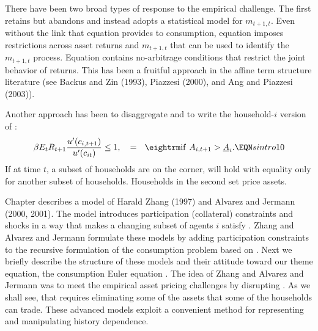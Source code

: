   There have been two broad types of response to the empirical challenge.
The first retains  but abandons  and instead
 adopts
a statistical  model for $m_{t+1,t}$. Even without the link that
equation  provides to consumption, equation
 imposes restrictions across  asset returns and
$m_{t+1,t}$ that can be used to identify the $m_{t+1,t}$ process.
Equation  contains no-arbitrage conditions   that
restrict the joint behavior of returns. This has been a fruitful
approach in the affine  term structure literature (see Backus and
Zin  (1993), Piazzesi (2000), and Ang and Piazzesi
(2003)).  
  

  Another approach has been to disaggregate and
to  write the household-$i$ version of :
$$ \beta  E_t R_{t+1} {u'(c_{i,t+1}) \over u'(c_{it})} \leq 1, \quad
= \  \ {\rm if} \  A_{i,t+1} > \underline A_i. \EQN sintro10 $$ If at
time $t$, a subset of households are on the corner, 
will hold with equality only for another  subset  of households.
Households in the second set price assets.  

Chapter  describes a model of Harald Zhang
(1997) and Alvarez and Jermann (2000, 2001).  The model introduces
participation (collateral) constraints and shocks in a way that
makes a changing subset of agents $i$  satisfy .
 Zhang and Alvarez and Jermann formulate
these models by adding participation constraints to the recursive
formulation of the consumption problem based on .
Next we briefly describe the structure of these models and their
attitude toward our theme equation,  the consumption Euler
equation .  The idea of Zhang and Alvarez and Jermann
was to  meet the empirical asset pricing  challenges by disrupting
.   As we shall see, that requires  eliminating some
of the assets that some of the households can trade. These
advanced models exploit a convenient method for representing and
manipulating history dependence. 
 




